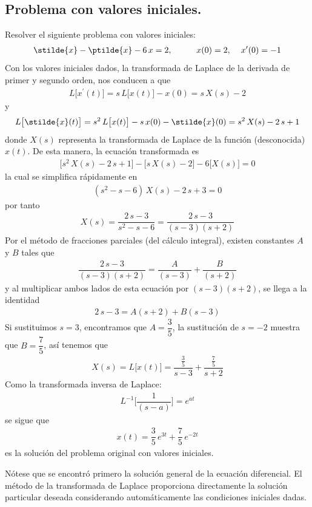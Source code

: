 \subsection{Problema con valores iniciales.}
Resolver el siguiente problema con valores iniciales:
\begin{align*}
\stilde{x} - \ptilde{x} - 6 \, x = 2, \hspace{1cm} x(0)=2, \hspace{0.4cm} x^{\prime}(0) = -1
\end{align*}
Con los valores iniciales dados, la transformada de Laplace de la derivada de primer y segundo orden, nos conducen a que
\begin{align*}
L \big[x^{\prime}(t)\big] = s \, L \big[x(t)\big] - x(0) =  s \, X(s) - 2
\end{align*}
y
\begin{align*}
L \big[\stilde{x}(t)\big] = s^{2} \, L \big[x(t)\big] - s \, x(0) - \stilde{x} (0) =  s^{2} \, X(s) - 2 \, s + 1
\end{align*}
donde $X(s)$ representa la transformada de Laplace de la función (desconocida) $x(t)$. De esta manera, la ecuación transformada es
\begin{align*}
\big[ s^{2} \, X(s) - 2 \, s + 1 \big] - \big[ s \, X(s) - 2 \big] - 6 \big[X(s)\big] = 0
\end{align*}
la cual se simplifica rápidamente en
\begin{align*}
(s^{2} - s - 6) \, X(s) - 2 \, s + 3 = 0
\end{align*}
por tanto
\begin{align*}
X(s) = \dfrac{2 \, s - 3}{s^{2} - s - 6} = \dfrac{2 \, s - 3}{(s-3)(s+2)}
\end{align*}
Por el método de fracciones parciales (del cálculo integral), existen constantes $A$ y $B$ tales que
\begin{align*}
\dfrac{2 \, s - 3}{(s-3)(s+2)} =  \dfrac{A}{(s - 3)} + \dfrac{B}{(s+2)}
\end{align*}
y al multiplicar ambos lados de esta ecuación por $(s-3)(s+2)$, se llega a la identidad
\begin{align*}
2 \, s - 3 = A (s + 2) +  B (s - 3)
\end{align*}
Si sustituimos $s = 3$, encontramos que $A = \dfrac{3}{5}$, la sustitución de $s = -2$ muestra que $B = \dfrac{7}{5}$, así tenemos que
\begin{align*}
X(s) = L \big[x(t)\big]  = \dfrac{\frac{3}{5}}{s - 3} + \dfrac{\frac{7}{5}}{s + 2}
\end{align*}
Como la transformada inversa de Laplace:
\begin{align*}
L^{-1} \bigg[\dfrac{1}{(s - a)} \bigg] = e^{a t}
\end{align*}
se sigue que
\begin{align*}
x(t) = \dfrac{3}{5} \, e^{3t} + \dfrac{7}{5} \, e^{-2t}
\end{align*}
es la solución del problema original con valores iniciales. 
\par
Nótese que se encontró primero la solución general de la ecuación diferencial. El método de la transformada de Laplace proporciona directamente la solución particular deseada considerando automáticamente las condiciones iniciales dadas.

